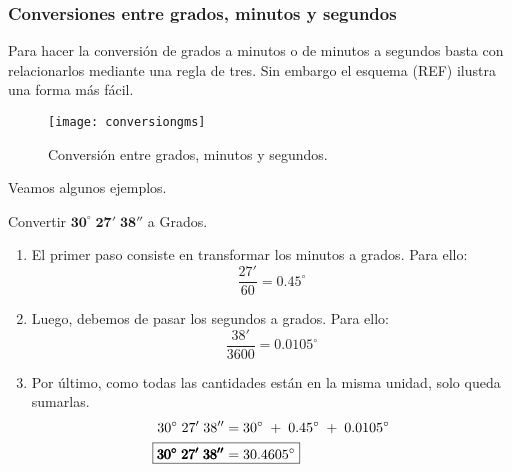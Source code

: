 \subsubsection{Conversiones entre grados, minutos y segundos}
Para hacer la conversión de grados a minutos o de minutos a segundos basta con 
relacionarlos mediante una regla de tres. Sin embargo el esquema (REF) ilustra
una forma más fácil. 

\begin{figure}[hb]
	\texttt{[image: conversiongms]}
	\caption[conversiongms]{Conversión entre grados, minutos y segundos.}
\end{figure}

Veamos algunos ejemplos.

\begin{example}
	Convertir $\pmb{30^\circ\; 27'\; 38''}$ a Grados. \\
	\begin{enumerate}
		\item El primer paso consiste en transformar los minutos a grados. 
		Para ello:
		\begin{equation*}
			\dfrac{27'}{60} = 0.45^\circ
		\end{equation*}

		\item Luego, debemos de pasar los segundos a grados. Para ello: 
		\begin{equation*}
			\dfrac{38'}{3600} = 0.0105^\circ
		\end{equation*}

		\item Por último, como todas las cantidades están en la misma unidad, solo 
		queda sumarlas.
		\begin{align*}
			30^\circ\; 27'\; 38'' &= 30^\circ\; +\; 0.45^\circ\; +\; 0.0105^\circ \\
			\Aboxed{\pmb{30^\circ\; 27'\; 38''} &= 30.4605^\circ}
		\end{align*}

	\end{enumerate}
\end{example}


